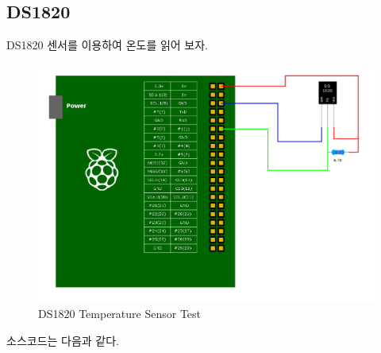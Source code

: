 \documentclass[11pt
  , a4paper
  , article
  , oneside
]{memoir}
\begin{document}
\subsection{DS1820}
DS1820 센서를 이용하여 온도를 읽어 보자.
\begin{figure}[!htb]
\centering
\includegraphics[width=1\textwidth]{./images/raspberry/ds1820_test.png}
\caption{DS1820 Temperature Sensor Test}
\label{fig:ds1820_test}
\end{figure}
소스코드는 다음과 같다.
\end{document}
